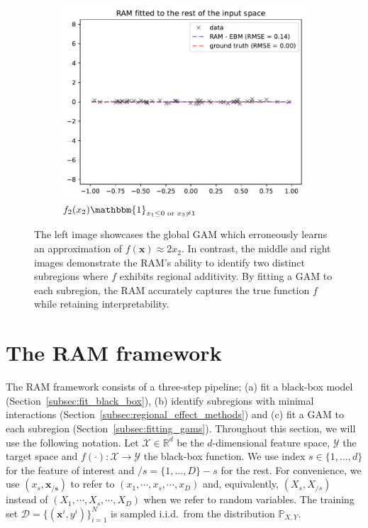 \documentclass[12pt]{article}
\newcommand{\Rd}{\mathbb{R}^d}
\newcommand{\xb}{\mathbf{x}}
\newcommand{\xcc}{\mathbf{x_{/s}}}
\newcommand{\Xcal}{\mathcal{X}}
\newcommand{\Ycal}{\mathcal{Y}}
\newcommand{\when}[1]{\mathbbm{1}_{#1}}
\begin{document}
\begin{figure}[htbp]
\begin{subfigure}{0.32\textwidth}
    \end{subfigure}
    \begin{subfigure}{0.32\textwidth}
        \centering
        \includegraphics[width=\textwidth]{figures/regional_gam_subreg_2}
        \caption{\(f_2(x_2) \when{x_1 \leq 0 \text{ or } x_3 \neq 1}\)}
        \label{subfig:regional_gam_2}
    \end{subfigure}
    \caption{The left image showcases the global GAM which erroneously learns an approximation of \(f(\xb) \approx 2x_2\).
    In contrast, the middle and right images demonstrate the RAM's ability to identify two distinct subregions where \(f\) exhibits regional additivity.
    By fitting a GAM to each subregion, the RAM accurately captures the true function $f$ while retaining interpretability.}
    \label{fig:ram_example}
\end{figure}


\section{The RAM framework}

The RAM framework consists of a three-step pipeline; (a) fit a black-box model (Section~\ref{subsec:fit_black_box}),
(b) identify subregions with minimal interactions (Section~\ref{subsec:regional_effect_methods}) and
(c) fit a GAM to each subregion (Section~\ref{subsec:fitting_gams}).
Throughout this section, we will use the following notation.
Let \(\Xcal \in \Rd\) be the \(d\)-dimensional feature space, \(\Ycal\) the target space and \(f(\cdot) : \Xcal \rightarrow \Ycal\) the black-box function.
We use index \(s \in \{1, \ldots, d\}\) for the feature of interest and \(/s = \{1, \ldots, D\} - s\) for the rest.
For convenience, we use \((x_s, \xcc)\) to refer to \((x_1, \cdots , x_s, \cdots, x_D)\) and, equivalently, \((X_s, X_{/s})\) instead of \((X_1, \cdots , X_s, \cdots, X_D)\) when we refer to random variables.
The training set \(\mathcal{D} = \{(\xb^i, y^i)\}_{i=1}^N\) is sampled
i.i.d.\ from the distribution \(\mathbb{P}_{X,Y}\).
\end{document}
